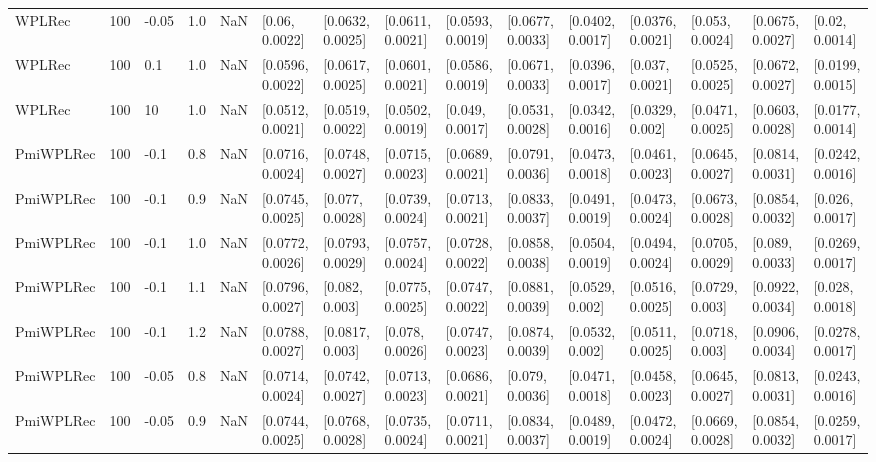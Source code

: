 \begin{tabular}{lllrrllllllllll}
    WPLRec &  100 & -0.05 &   1.0 &   NaN &    [0.06, 0.0022] &  [0.0632, 0.0025] &  [0.0611, 0.0021] &  [0.0593, 0.0019] &  [0.0677, 0.0033] &  [0.0402, 0.0017] &  [0.0376, 0.0021] &   [0.053, 0.0024] &  [0.0675, 0.0027] &    [0.02, 0.0014] \\
    WPLRec &  100 &   0.1 &   1.0 &   NaN &  [0.0596, 0.0022] &  [0.0617, 0.0025] &  [0.0601, 0.0021] &  [0.0586, 0.0019] &  [0.0671, 0.0033] &  [0.0396, 0.0017] &   [0.037, 0.0021] &  [0.0525, 0.0025] &  [0.0672, 0.0027] &  [0.0199, 0.0015] \\
    WPLRec &  100 &    10 &   1.0 &   NaN &  [0.0512, 0.0021] &  [0.0519, 0.0022] &  [0.0502, 0.0019] &   [0.049, 0.0017] &  [0.0531, 0.0028] &  [0.0342, 0.0016] &   [0.0329, 0.002] &  [0.0471, 0.0025] &  [0.0603, 0.0028] &  [0.0177, 0.0014] \\
 PmiWPLRec &  100 &  -0.1 &   0.8 &   NaN &  [0.0716, 0.0024] &  [0.0748, 0.0027] &  [0.0715, 0.0023] &  [0.0689, 0.0021] &  [0.0791, 0.0036] &  [0.0473, 0.0018] &  [0.0461, 0.0023] &  [0.0645, 0.0027] &  [0.0814, 0.0031] &  [0.0242, 0.0016] \\
 PmiWPLRec &  100 &  -0.1 &   0.9 &   NaN &  [0.0745, 0.0025] &   [0.077, 0.0028] &  [0.0739, 0.0024] &  [0.0713, 0.0021] &  [0.0833, 0.0037] &  [0.0491, 0.0019] &  [0.0473, 0.0024] &  [0.0673, 0.0028] &  [0.0854, 0.0032] &   [0.026, 0.0017] \\
 PmiWPLRec &  100 &  -0.1 &   1.0 &   NaN &  [0.0772, 0.0026] &  [0.0793, 0.0029] &  [0.0757, 0.0024] &  [0.0728, 0.0022] &  [0.0858, 0.0038] &  [0.0504, 0.0019] &  [0.0494, 0.0024] &  [0.0705, 0.0029] &   [0.089, 0.0033] &  [0.0269, 0.0017] \\
 PmiWPLRec &  100 &  -0.1 &   1.1 &   NaN &  [0.0796, 0.0027] &    [0.082, 0.003] &  [0.0775, 0.0025] &  [0.0747, 0.0022] &  [0.0881, 0.0039] &   [0.0529, 0.002] &  [0.0516, 0.0025] &   [0.0729, 0.003] &  [0.0922, 0.0034] &   [0.028, 0.0018] \\
 PmiWPLRec &  100 &  -0.1 &   1.2 &   NaN &  [0.0788, 0.0027] &   [0.0817, 0.003] &   [0.078, 0.0026] &  [0.0747, 0.0023] &  [0.0874, 0.0039] &   [0.0532, 0.002] &  [0.0511, 0.0025] &   [0.0718, 0.003] &  [0.0906, 0.0034] &  [0.0278, 0.0017] \\
 PmiWPLRec &  100 & -0.05 &   0.8 &   NaN &  [0.0714, 0.0024] &  [0.0742, 0.0027] &  [0.0713, 0.0023] &  [0.0686, 0.0021] &   [0.079, 0.0036] &  [0.0471, 0.0018] &  [0.0458, 0.0023] &  [0.0645, 0.0027] &  [0.0813, 0.0031] &  [0.0243, 0.0016] \\
 PmiWPLRec &  100 & -0.05 &   0.9 &   NaN &  [0.0744, 0.0025] &  [0.0768, 0.0028] &  [0.0735, 0.0024] &  [0.0711, 0.0021] &  [0.0834, 0.0037] &  [0.0489, 0.0019] &  [0.0472, 0.0024] &  [0.0669, 0.0028] &  [0.0854, 0.0032] &  [0.0259, 0.0017] \\

\end{tabular}
